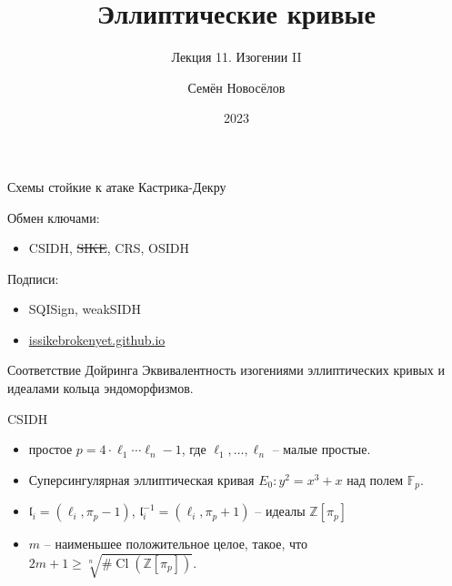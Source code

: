 \documentclass{beamer}
\title{Эллиптические кривые}
\subtitle{Лекция 11. Изогении II}
\author{Семён Новосёлов}
\institute{БФУ им. И. Канта}
\date{2023}
\begin{document}
\frame{\titlepage}

\newcommand{\UserA}{{\structure{{\Large\faUserSecret}}}}
\newcommand{\UserB}{{\structure{{\Large\faCat}}}}

\begin{frame}{Схемы стойкие к атаке Кастрика-Декру}

Обмен ключами:
\begin{itemize}
	\item CSIDH, \sout{SIKE}, CRS, OSIDH
\end{itemize}
\vspace{0.5em}

Подписи:
\begin{itemize}
	\item SQISign, weakSIDH
\end{itemize}

\vspace{0.5em}
\begin{itemize}
	\item[\structure{{\faGlobe}}] \href{https://issikebrokenyet.github.io/}{issikebrokenyet.github.io}
\end{itemize}
\end{frame}

\begin{frame}{Соответствие Дойринга}
Эквивалентность изогениями эллиптических кривых и идеалами кольца эндоморфизмов.
\end{frame}

\begin{frame}{CSIDH}
	\begin{itemize}
		\item простое $p=4\cdot \ell_1 \cdots \ell_n - 1$, где $\ell_1, \ldots, \ell_n$ -- малые простые.
		\item Суперсингулярная эллиптическая кривая $E_0: y^2=x^3+x$ над полем $\mathbb{F}_p$.
		\item $\mathfrak{l}_i=(\ell_i, \pi_p-1)$, $\mathfrak{l}_i^{-1}=(\ell_i, \pi_p+1)$ -- идеалы $\mathbb{Z}[\pi_p]$
		\item $m$ -- наименьшее положительное целое, такое, что $2m+1 \geq \sqrt[n]{\# \operatorname{Cl}(\mathbb{Z}[\pi_p])}$.
	\end{itemize}
\end{frame}
\end{document}
